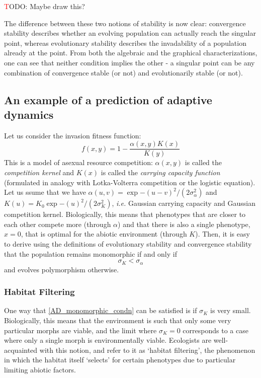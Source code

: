{\textcolor{red}TODO: Maybe draw this?}

The difference between these two notions of stability is now clear: convergence stability describes whether an evolving population can actually reach the singular point, whereas evolutionary stability describes the invadability of a population already at the point. From both the algebraic and the graphical characterizations, one can see that neither condition implies the other - a singular point can be any combination of convergence stable (or not) and evolutionarily stable (or not).  

\subsection{An example of a prediction of adaptive dynamics}

Let us consider the invasion fitness function:
\begin{equation}
	\label{AD_cts_logistic_invasion_fitness}
	f(x,y) = 1 - \frac{\alpha(x,y)K(x)}{K(y)}
\end{equation}
This is a model of asexual resource competition:  $\alpha(x,y)$ is called the \emph{competition kernel} and $K(x)$ is called the \emph{carrying capacity function} (formulated in analogy with Lotka-Volterra competition or the logistic equation).  Let us ssume that we have $\alpha(u,v) = \exp{-(u-v)^2/(2\sigma^{2}_{\alpha})}$ and $K(u) = K_{0}\exp{-(u)^2/(2\sigma^{2}_{K})}$, \emph{i.e.} Gaussian carrying capacity and Gaussian competition kernel. Biologically, this means that phenotypes that are closer to each other compete more (through $\alpha$) and that there is also a single phenotype, $x=0$, that is optimal for the abiotic environment (through $K$). Then, it is easy to derive using the definitions of evolutionary stability and convergence stability that the population remains monomorphic if and only if
\begin{equation}\label{AD_monomorphic_condn}
	\sigma_K<\sigma_{\alpha}
\end{equation}
and evolves polymorphism otherwise.
\subsubsection{Habitat Filtering}
One way that \ref{AD_monomorphic_condn} can be satisfied is if $\sigma_K$ is very small. Biologically, this means that the environment is such that only some very particular morphs are viable, and the limit where $\sigma_K = 0$ corresponds to a case where only a single morph is environmentally viable. Ecologists are well-acquainted with this notion, and refer to it as `habitat filtering', the phenomenon in which the habitat itself `selects' for certain phenotypes due to particular limiting abiotic factors.

